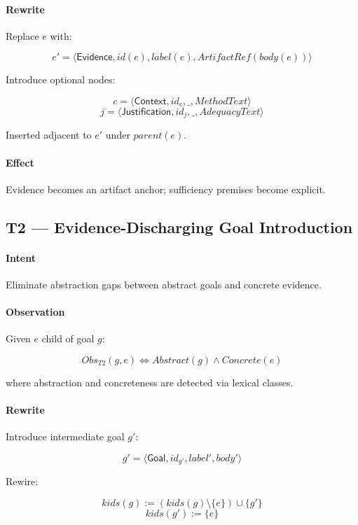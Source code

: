 \documentclass[12pt,twoside,a4paper]{article}
\begin{document}
\paragraph{Rewrite}

Replace $e$ with:

\[
e' = \langle \mathsf{Evidence}, id(e), label(e), ArtifactRef(body(e)) \rangle
\]

Introduce optional nodes:

\[
c = \langle \mathsf{Context}, id_c, \_, MethodText \rangle
\]
\[
j = \langle \mathsf{Justification}, id_j, \_, AdequacyText \rangle
\]

Inserted adjacent to $e'$ under $parent(e)$.

\paragraph{Effect}
Evidence becomes an artifact anchor; sufficiency premises become explicit.

\subsection{T2 --- Evidence-Discharging Goal Introduction}

\paragraph{Intent}
Eliminate abstraction gaps between abstract goals and concrete evidence.

\paragraph{Observation}

Given $e$ child of goal $g$:

\[
Obs_{T2}(g,e) \iff Abstract(g) \wedge Concrete(e)
\]

where abstraction and concreteness are detected via lexical classes.

\paragraph{Rewrite}

Introduce intermediate goal $g'$:

\[
g' = \langle \mathsf{Goal}, id_{g'}, label', body' \rangle
\]

Rewire:

\[
kids(g) := (kids(g) \setminus \{e\}) \cup \{g'\}
\]
\[
kids(g') := \{e\}
\]
\end{document}
